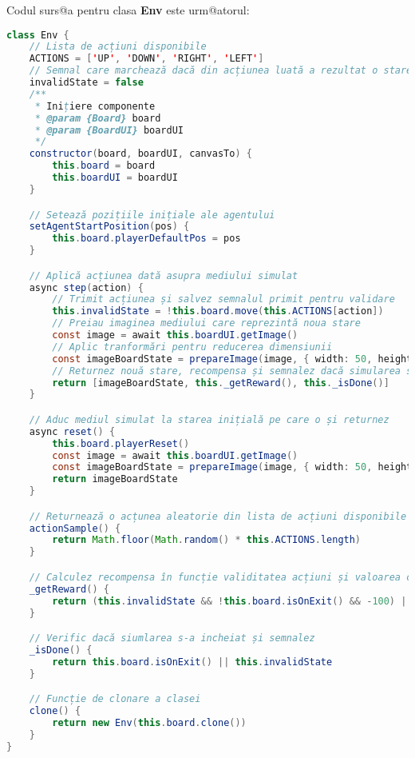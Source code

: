 
Codul surs@a pentru clasa \textbf{Env} este urm@atorul:

\begin{lstlisting}[language=Java, caption=Definirea clasei Env]
class Env {
    // Lista de acțiuni disponibile
    ACTIONS = ['UP', 'DOWN', 'RIGHT', 'LEFT']
    // Semnal care marchează dacă din acțiunea luată a rezultat o stare invalidă
    invalidState = false
    /**
     * Inițiere componente
     * @param {Board} board 
     * @param {BoardUI} boardUI
     */
    constructor(board, boardUI, canvasTo) {
        this.board = board
        this.boardUI = boardUI
    }

    // Setează pozițiile inițiale ale agentului
    setAgentStartPosition(pos) {
        this.board.playerDefaultPos = pos
    }

    // Aplică acțiunea dată asupra mediului simulat
    async step(action) {
        // Trimit acțiunea și salvez semnalul primit pentru validare
        this.invalidState = !this.board.move(this.ACTIONS[action])
        // Preiau imaginea mediului care reprezintă noua stare
        const image = await this.boardUI.getImage()
        // Aplic tranformări pentru reducerea dimensiunii
        const imageBoardState = prepareImage(image, { width: 50, height: 50 })
        // Returnez nouă stare, recompensa și semnalez dacă simularea s-a încheiat
        return [imageBoardState, this._getReward(), this._isDone()]
    }

    // Aduc mediul simulat la starea inițială pe care o și returnez
    async reset() {
        this.board.playerReset()
        const image = await this.boardUI.getImage()
        const imageBoardState = prepareImage(image, { width: 50, height: 50 })
        return imageBoardState
    }

    // Returnează o acțunea aleatorie din lista de acțiuni disponibile
    actionSample() {
        return Math.floor(Math.random() * this.ACTIONS.length)
    }

    // Calculez recompensa în funcție validitatea acțiuni și valoarea celulei
    _getReward() {
        return (this.invalidState && !this.board.isOnExit() && -100) || this.board.getPlayerCellValue()
    }

    // Verific dacă siumlarea s-a incheiat și semnalez
    _isDone() {
        return this.board.isOnExit() || this.invalidState
    }

    // Funcție de clonare a clasei
    clone() {
        return new Env(this.board.clone())
    }
}
\end{lstlisting}


